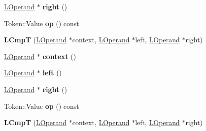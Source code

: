 \begin{DoxyCompactItemize}
\item 
\hyperlink{classv8_1_1internal_1_1_l_operand}{L\+Operand} $\ast$ {\bfseries right} ()\hypertarget{classv8_1_1internal_1_1_l_cmp_t_a13a757622a5ddbff0584adc3b84baa8d}{}\label{classv8_1_1internal_1_1_l_cmp_t_a13a757622a5ddbff0584adc3b84baa8d}

\item 
Token\+::\+Value {\bfseries op} () const \hypertarget{classv8_1_1internal_1_1_l_cmp_t_affeb8a538e036a9115089631b13671f8}{}\label{classv8_1_1internal_1_1_l_cmp_t_affeb8a538e036a9115089631b13671f8}

\item 
{\bfseries L\+CmpT} (\hyperlink{classv8_1_1internal_1_1_l_operand}{L\+Operand} $\ast$context, \hyperlink{classv8_1_1internal_1_1_l_operand}{L\+Operand} $\ast$left, \hyperlink{classv8_1_1internal_1_1_l_operand}{L\+Operand} $\ast$right)\hypertarget{classv8_1_1internal_1_1_l_cmp_t_af9639e776ae4b34555d2d8b124fd06a2}{}\label{classv8_1_1internal_1_1_l_cmp_t_af9639e776ae4b34555d2d8b124fd06a2}

\item 
\hyperlink{classv8_1_1internal_1_1_l_operand}{L\+Operand} $\ast$ {\bfseries context} ()\hypertarget{classv8_1_1internal_1_1_l_cmp_t_a0beea53d13e064416006b17596aae2a1}{}\label{classv8_1_1internal_1_1_l_cmp_t_a0beea53d13e064416006b17596aae2a1}

\item 
\hyperlink{classv8_1_1internal_1_1_l_operand}{L\+Operand} $\ast$ {\bfseries left} ()\hypertarget{classv8_1_1internal_1_1_l_cmp_t_a6468d4b481e8c5ea5d268ad8b9bb0770}{}\label{classv8_1_1internal_1_1_l_cmp_t_a6468d4b481e8c5ea5d268ad8b9bb0770}

\item 
\hyperlink{classv8_1_1internal_1_1_l_operand}{L\+Operand} $\ast$ {\bfseries right} ()\hypertarget{classv8_1_1internal_1_1_l_cmp_t_a13a757622a5ddbff0584adc3b84baa8d}{}\label{classv8_1_1internal_1_1_l_cmp_t_a13a757622a5ddbff0584adc3b84baa8d}

\item 
Token\+::\+Value {\bfseries op} () const \hypertarget{classv8_1_1internal_1_1_l_cmp_t_affeb8a538e036a9115089631b13671f8}{}\label{classv8_1_1internal_1_1_l_cmp_t_affeb8a538e036a9115089631b13671f8}

\item 
{\bfseries L\+CmpT} (\hyperlink{classv8_1_1internal_1_1_l_operand}{L\+Operand} $\ast$context, \hyperlink{classv8_1_1internal_1_1_l_operand}{L\+Operand} $\ast$left, \hyperlink{classv8_1_1internal_1_1_l_operand}{L\+Operand} $\ast$right)\hypertarget{classv8_1_1internal_1_1_l_cmp_t_af9639e776ae4b34555d2d8b124fd06a2}{}\label{classv8_1_1internal_1_1_l_cmp_t_af9639e776ae4b34555d2d8b124fd06a2}


\end{DoxyCompactItemize}
